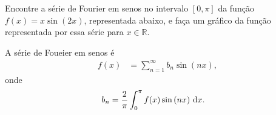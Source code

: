 \documentclass[a4paper,12pt, leqno, answers]{exam}
\begin{document}
\begin{questions}
    \question[T1 de 2012] Encontre a s\'{e}rie de Fourier em senos no intervalo $[0,\pi]$ da fun\c{c}\~{a}o $f(x) = x \sin\left( 2 x \right)$, representada abaixo, e fa\c{c}a um gr\'{a}fico da fun\c{c}\~{a}o representada por essa s\'{e}rie para $x \in \mathbb{R}$.
    \begin{center}
    \end{center}
    \begin{solution}
        A s\'{e}rie de Foueier em senos \'{e}
        \begin{align*}
            f(x) &= \sum_{n = 1}^\infty b_n \sin\left( n x \right),
        \end{align*}
        onde
        \begin{align*}
            b_n &= \frac{2}{\pi} \int_0^\pi f(x) \sin\left( n x \right) \, \mathrm{d}x.
        \end{align*}


\end{solution}
\end{questions}
\end{document}
